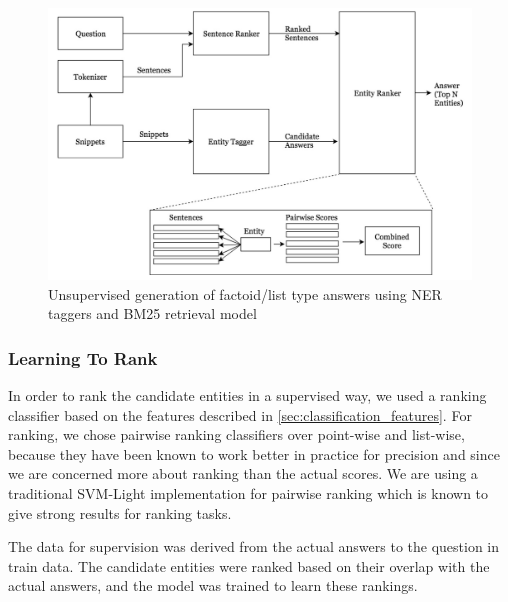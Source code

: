 \documentclass[11pt,a4paper]{article}
\begin{document}
\begin{figure}
    \centering
    \includegraphics[scale=0.4]{UnsupervisedNERPipeline.png}
    \caption{Unsupervised generation of factoid/list type answers using NER taggers and BM25 retrieval model}
    \label{fig:UnsupervisedNERPipeline}
\end{figure}

\subsubsection{Learning To Rank}

In order to rank the candidate entities in a supervised way, we used a ranking classifier based on the features described in \ref{sec:classification_features}. For ranking, we chose pairwise ranking classifiers over point-wise and list-wise, because they have been known to work better in practice for precision and since we are concerned more about ranking than the actual scores. We are using a traditional SVM-Light \cite{svmlight} implementation for pairwise ranking which is known to give strong results for ranking tasks.

The data for supervision was derived from the actual answers to the question in train data. The candidate entities were ranked based on their overlap with the actual answers, and the model was trained to learn these rankings.

\end{document}

